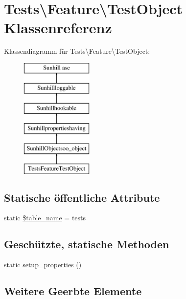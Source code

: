 \hypertarget{classTests_1_1Feature_1_1TestObject}{}\section{Tests\textbackslash{}Feature\textbackslash{}Test\+Object Klassenreferenz}
\label{classTests_1_1Feature_1_1TestObject}
Klassendiagramm für Tests\textbackslash{}Feature\textbackslash{}Test\+Object\+:\begin{figure}[H]
\begin{center}
\leavevmode
\includegraphics[height=6.000000cm]{df/ddf/classTests_1_1Feature_1_1TestObject}
\end{center}
\end{figure}
\subsection*{Statische öffentliche Attribute}
\begin{DoxyCompactItemize}
\item 
static \hyperlink{classTests_1_1Feature_1_1TestObject_accb55c139033017f850aec11c5ac4401}{\$table\+\_\+name} = \textquotesingle{}tests\textquotesingle{}
\end{DoxyCompactItemize}
\subsection*{Geschützte, statische Methoden}
\begin{DoxyCompactItemize}
\item 
static \hyperlink{classTests_1_1Feature_1_1TestObject_a819811a83531fee12d7809ee5edb898e}{setup\+\_\+properties} ()
\end{DoxyCompactItemize}
\subsection*{Weitere Geerbte Elemente}


